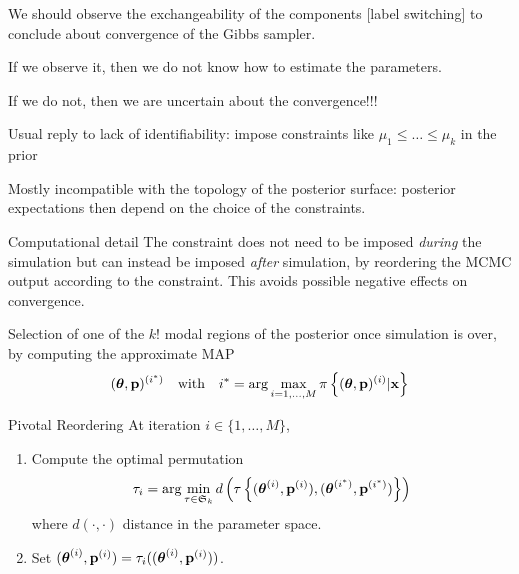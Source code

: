 \begin{slide}
We should observe the exchangeability of the components [label switching] to conclude
about convergence of the Gibbs sampler. 

\vs\pause If we observe it, then we do not know how to
estimate the parameters. 

\vs\pause If we do not, then we are uncertain about the convergence!!!

\end{slide}\begin{slide}

Usual reply to lack of identifiability: impose constraints like ${\mu_1\le\ldots\le\mu_k}$
in the prior

\vs\pause Mostly incompatible with the topology of the posterior surface: posterior 
expectations then depend on the choice of the constraints.

\vs\pause
\begin{block}{Computational detail}
The constraint does not need to be imposed {\em during} the simulation
but can instead be imposed {\em after} simulation, by reordering the
MCMC output according to the constraint. This avoids possible negative effects
on convergence.
\end{block}

\end{slide}\begin{slide}

Selection of one of the $k!$ modal regions of the posterior once simulation is over,
by computing the approximate MAP
\small$$
(\mbox{\boldmath{$\theta$}},\mathbf{p})^{(i^*)}\quad\text{with}\quad
i^*=\arg\max_{i=1,\ldots,M} \pi\left\{ (\mbox{\boldmath{$\theta$}},\mathbf{p})^{(i)}|\mathbf{x} \right\}
$$\normalsize

\pause
\begin{block}{Pivotal Reordering}
At iteration $i\in\{1,\ldots,M\}$,
\begin{enumerate}
\item Compute the optimal permutation
\small$$
\tau_i=\arg\min_{\tau\in\mathfrak{S}_k} d\left(\tau\left\{
(\mbox{\boldmath{$\theta$}}^{(i)},\mathbf{p}^{(i)}),(\mbox{\boldmath{$\theta$}}^{(i^*)},\mathbf{p}^{(i^*)})
\right\}\right)
$$\normalsize
where $d(\cdot,\cdot)$ distance in the parameter space.
\item Set $(\mbox{\boldmath{$\theta$}}^{(i)},\mathbf{p}^{(i)})=\tau_i((\mbox{\boldmath{$\theta$}}^{(i)},\mathbf{p}^{(i)}))$.
\end{enumerate}
\end{block}

\end{slide}\begin{slide}


\end{slide}
